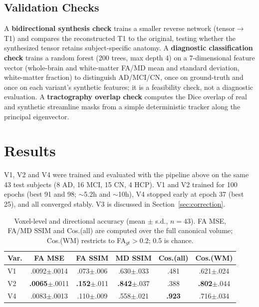 \documentclass[conference,compsoc]{IEEEtran}
\begin{document}
\subsection{Validation Checks}
A \textbf{bidirectional synthesis check} trains a smaller reverse network (tensor$\to$T1) and compares the reconstructed T1 to the original, testing whether the synthesized tensor retains subject-specific anatomy. A \textbf{diagnostic classification check} trains a random forest (200 trees, max depth 4) on a 7-dimensional feature vector (whole-brain and white-matter FA/MD mean and standard deviation, white-matter fraction) to distinguish AD/MCI/CN, once on ground-truth and once on each variant's synthetic features; it is a feasibility check, not a diagnostic evaluation. A \textbf{tractography overlap check} computes the Dice overlap of real and synthetic streamline masks from a simple deterministic tracker along the principal eigenvector.

\section{Results}
\label{sec:results}
V1, V2 and V4 were trained and evaluated with the pipeline above on the same 43 test subjects (8 AD, 16 MCI, 15 CN, 4 HCP). V1 and V2 trained for 100 epochs (best 91 and 98; $\sim$5.2h and $\sim$10h), V4 stopped early at epoch 37 (best 25), and all converged stably. V3 is discussed in Section~\ref{sec:correction}.

\begin{table}[t]
\centering
\footnotesize
\setlength{\tabcolsep}{2.6pt}
\caption{Voxel-level and directional accuracy (mean $\pm$ s.d., $n=43$). FA MSE, FA/MD SSIM and Cos.(all) are computed over the full canonical volume; Cos.(WM) restricts to FA$_{gt}>0.2$; 0.5 is chance.}
\label{tab:main_results}
\begin{tabular}{lccccc}
\toprule
\textbf{Var.} & \textbf{FA MSE} & \textbf{FA SSIM} & \textbf{MD SSIM} & \textbf{Cos.(all)} & \textbf{Cos.(WM)} \\
\midrule
V1 & .0092{\scriptsize$\pm$.0014} & .073{\scriptsize$\pm$.006} & .630{\scriptsize$\pm$.033} & .481 & .621{\scriptsize$\pm$.024} \\
V2 & \textbf{.0065}{\scriptsize$\pm$.0011} & \textbf{.152}{\scriptsize$\pm$.011} & \textbf{.842}{\scriptsize$\pm$.037} & .388 & \textbf{.802}{\scriptsize$\pm$.044} \\
V4 & .0083{\scriptsize$\pm$.0013} & .110{\scriptsize$\pm$.009} & .558{\scriptsize$\pm$.021} & \textbf{.923} & .716{\scriptsize$\pm$.034} \\
\bottomrule
\end{tabular}
\end{table}
\end{document}
